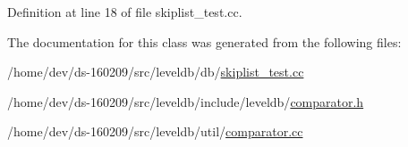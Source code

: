Definition at line 18 of file skiplist\+\_\+test.\+cc.



The documentation for this class was generated from the following files\+:\begin{DoxyCompactItemize}
\item 
/home/dev/ds-\/160209/src/leveldb/db/\hyperlink{skiplist__test_8cc}{skiplist\+\_\+test.\+cc}\item 
/home/dev/ds-\/160209/src/leveldb/include/leveldb/\hyperlink{comparator_8h}{comparator.\+h}\item 
/home/dev/ds-\/160209/src/leveldb/util/\hyperlink{comparator_8cc}{comparator.\+cc}\end{DoxyCompactItemize}
